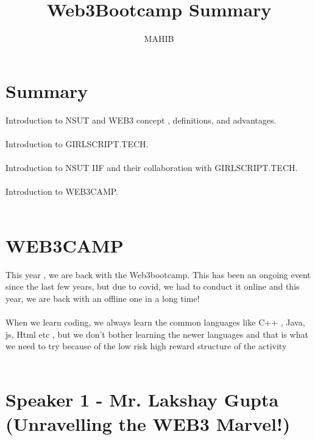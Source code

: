 \documentclass[a4paper,30pt]{report}
\title{\Huge{\textbf{Web3Bootcamp Summary}}}
\author{MAHIB}
\begin{document}
  \maketitle\date{}\newpage
  \tableofcontents\newpage
  
  \chapter{Summary}
      Introduction to NSUT and WEB3 concept , definitions, and advantages.\\\\
      Introduction to GIRLSCRIPT.TECH.\\\\
      Introduction to NSUT IIF and their collaboration with GIRLSCRIPT.TECH.\\\\
      Introduction to WEB3CAMP.\\\\ 
  \chapter{WEB3CAMP} This year , we are back with the Web3bootcamp. This has been an ongoing event since the last few years, but due to covid, we had to conduct it online and this year, we are back with an offline one in a long time!\\\\
      When we learn coding, we always learn the common languages like C++ , Java, js, Html etc , but we don't bother learning the newer languages and that is what we need to try because of the low risk high reward structure of the activity\\\\

  \chapter{Speaker 1 - Mr. Lakshay Gupta (Unravelling the WEB3 Marvel!)} 
\end{document}
